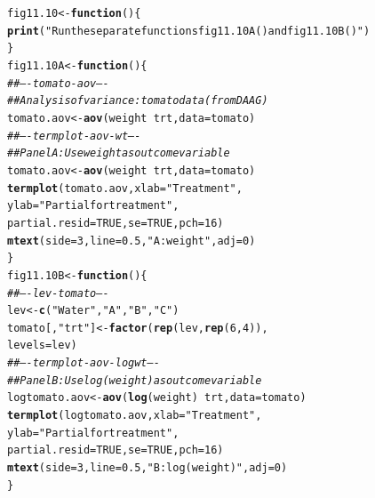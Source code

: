 \documentclass[12pt, a4paper,  BCOR=8.25mm, DIV=15]{scrartcl}\usepackage[]{graphicx}\usepackage[]{color}
\makeatletter
\newcommand{\hlnum}[1]{\textcolor[rgb]{0.686,0.059,0.569}{#1}}%
\newcommand{\hlstr}[1]{\textcolor[rgb]{0.192,0.494,0.8}{#1}}%
\newcommand{\hlcom}[1]{\textcolor[rgb]{0.678,0.584,0.686}{\textit{#1}}}%
\newcommand{\hlopt}[1]{\textcolor[rgb]{0,0,0}{#1}}%
\newcommand{\hlstd}[1]{\textcolor[rgb]{0.345,0.345,0.345}{#1}}%
\newcommand{\hlkwa}[1]{\textcolor[rgb]{0.161,0.373,0.58}{\textbf{#1}}}%
\newcommand{\hlkwb}[1]{\textcolor[rgb]{0.69,0.353,0.396}{#1}}%
\newcommand{\hlkwc}[1]{\textcolor[rgb]{0.333,0.667,0.333}{#1}}%
\newcommand{\hlkwd}[1]{\textcolor[rgb]{0.737,0.353,0.396}{\textbf{#1}}}%
\newenvironment{kframe}{%
 \def\at@end@of@kframe{}%
 \ifinner\ifhmode%
  \def\at@end@of@kframe{\end{minipage}}%
  \begin{minipage}{\columnwidth}%
 \fi\fi%
 \def\FrameCommand##1{\hskip\@totalleftmargin \hskip-\fboxsep
 \colorbox{shadecolor}{##1}\hskip-\fboxsep
     \hskip-\linewidth \hskip-\@totalleftmargin \hskip\columnwidth}%
 \MakeFramed {\advance\hsize-\width
   \@totalleftmargin\z@ \linewidth\hsize
   \@setminipage}}%
 {\par\unskip\endMakeFramed%
 \at@end@of@kframe}
\newenvironment{knitrout}{}{} %
\makeatother
\begin{document}
\begin{knitrout}
\color{fgcolor}\begin{kframe}
\begin{alltt}
\hlstd{fig11.10} \hlkwb{<-} \hlkwa{function}\hlstd{()\{}
\hlkwd{print}\hlstd{(}\hlstr{"Run the separate functions fig11.10A() and fig11.10B()"}\hlstd{)}
\hlstd{\}}
\hlstd{fig11.10A} \hlkwb{<-} \hlkwa{function}\hlstd{()\{}
\hlcom{## ---- tomato-aov ----}
\hlcom{## Analysis of variance: tomato data (from DAAG)}
\hlstd{tomato.aov} \hlkwb{<-} \hlkwd{aov}\hlstd{(weight} \hlopt{~} \hlstd{trt,} \hlkwc{data}\hlstd{=tomato)}
\hlcom{## ---- termplot-aov-wt ----}
\hlcom{## Panel A: Use weight as outcome variable}
\hlstd{tomato.aov} \hlkwb{<-} \hlkwd{aov}\hlstd{(weight} \hlopt{~} \hlstd{trt,} \hlkwc{data}\hlstd{=tomato)}
\hlkwd{termplot}\hlstd{(tomato.aov,} \hlkwc{xlab}\hlstd{=}\hlstr{"Treatment"}\hlstd{,}
         \hlkwc{ylab}\hlstd{=}\hlstr{"Partial for treatment"}\hlstd{,}
         \hlkwc{partial.resid}\hlstd{=}\hlnum{TRUE}\hlstd{,} \hlkwc{se}\hlstd{=}\hlnum{TRUE}\hlstd{,} \hlkwc{pch}\hlstd{=}\hlnum{16}\hlstd{)}
\hlkwd{mtext}\hlstd{(}\hlkwc{side}\hlstd{=}\hlnum{3}\hlstd{,} \hlkwc{line}\hlstd{=}\hlnum{0.5}\hlstd{,} \hlstr{"A: weight"}\hlstd{,} \hlkwc{adj}\hlstd{=}\hlnum{0}\hlstd{)}
\hlstd{\}}
\hlstd{fig11.10B} \hlkwb{<-} \hlkwa{function}\hlstd{()\{}
\hlcom{## ---- lev-tomato ----}
\hlstd{lev} \hlkwb{<-} \hlkwd{c}\hlstd{(}\hlstr{"Water"}\hlstd{,} \hlstr{"A"}\hlstd{,} \hlstr{"B"}\hlstd{,} \hlstr{"C"}\hlstd{)}
\hlstd{tomato[,} \hlstr{"trt"}\hlstd{]} \hlkwb{<-} \hlkwd{factor}\hlstd{(}\hlkwd{rep}\hlstd{(lev,} \hlkwd{rep}\hlstd{(}\hlnum{6}\hlstd{,}\hlnum{4}\hlstd{)),}
                          \hlkwc{levels}\hlstd{=lev)}
\hlcom{## ---- termplot-aov-logwt ----}
\hlcom{## Panel B: Use log(weight) as outcome variable}
\hlstd{logtomato.aov} \hlkwb{<-} \hlkwd{aov}\hlstd{(}\hlkwd{log}\hlstd{(weight)} \hlopt{~} \hlstd{trt,} \hlkwc{data}\hlstd{=tomato)}
\hlkwd{termplot}\hlstd{(logtomato.aov,} \hlkwc{xlab}\hlstd{=}\hlstr{"Treatment"}\hlstd{,}
         \hlkwc{ylab}\hlstd{=}\hlstr{"Partial for treatment"}\hlstd{,}
         \hlkwc{partial.resid}\hlstd{=}\hlnum{TRUE}\hlstd{,} \hlkwc{se}\hlstd{=}\hlnum{TRUE}\hlstd{,} \hlkwc{pch}\hlstd{=}\hlnum{16}\hlstd{)}
\hlkwd{mtext}\hlstd{(}\hlkwc{side}\hlstd{=}\hlnum{3}\hlstd{,} \hlkwc{line}\hlstd{=}\hlnum{0.5}\hlstd{,} \hlstr{"B: log(weight)"}\hlstd{,} \hlkwc{adj}\hlstd{=}\hlnum{0}\hlstd{)}
\hlstd{\}}
\end{alltt}
\end{kframe}
\end{knitrout}
\end{document}
